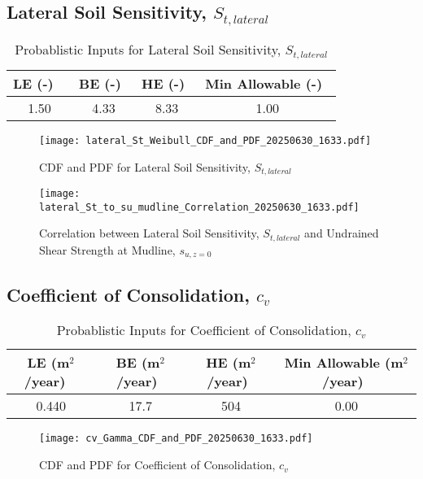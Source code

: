 \documentclass{article}
\begin{document}
\subsection*{Lateral Soil Sensitivity, $S_{{t,lateral}}$}
\begin{table}[h!]
\centering
\caption{Probablistic Inputs for Lateral Soil Sensitivity, $S_{{t,lateral}}$}
\begin{tabular}{|c|c|c|c|}
\hline
LE (-) \ & BE (-)\ & HE (-)\ & Min Allowable (-)\ \\
\hline
1.50 & 4.33 & 8.33 & 1.00 \\
\hline
\end{tabular}
\end{table}
\begin{figure}[h!]
\centering
\texttt{[image: lateral\_St\_Weibull\_CDF\_and\_PDF\_20250630\_1633.pdf]}
\caption{CDF and PDF for Lateral Soil Sensitivity, $S_{{t,lateral}}$}
\end{figure}
\begin{figure}[h!]
\centering
\texttt{[image: lateral\_St\_to\_su\_mudline\_Correlation\_20250630\_1633.pdf]}
\caption{Correlation between Lateral Soil Sensitivity, $S_{{t,lateral}}$ and Undrained Shear Strength at Mudline, $s_{{u,z=0}}$}
\end{figure}
\clearpage
\subsection*{Coefficient of Consolidation, $c_v$}
\begin{table}[h!]
\centering
\caption{Probablistic Inputs for Coefficient of Consolidation, $c_v$}
\begin{tabular}{|c|c|c|c|}
\hline
LE (m$^2$/year) \ & BE (m$^2$/year)\ & HE (m$^2$/year)\ & Min Allowable (m$^2$/year)\ \\
\hline
0.440 & 17.7 & 504 & 0.00 \\
\hline
\end{tabular}
\end{table}
\begin{figure}[h!]
\centering
\texttt{[image: cv\_Gamma\_CDF\_and\_PDF\_20250630\_1633.pdf]}
\caption{CDF and PDF for Coefficient of Consolidation, $c_v$}
\end{figure}
\clearpage
\end{document}
